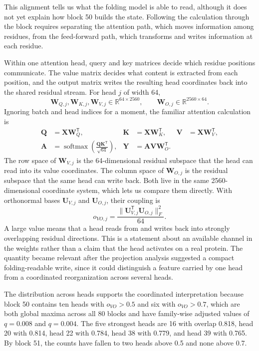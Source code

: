 \documentclass[11pt]{article}
\newcommand{\R}{\mathbb{R}}
\newcommand{\mat}[1]{\mathbf{#1}}
\begin{document}
This alignment tells us what the folding model is able to read, although it does not yet explain how block 50 builds the state. Following the calculation through the block requires separating the attention path, which moves information among residues, from the feed-forward path, which transforms and writes information at each residue.

Within one attention head, query and key matrices decide which residue positions communicate. The value matrix decides what content is extracted from each position, and the output matrix writes the resulting head coordinates back into the shared residual stream. For head $j$ of width 64,
\[
\mat{W}_{Q,j},\mat{W}_{K,j},\mat{W}_{V,j}\in\R^{64\times2560},
\qquad
\mat{W}_{O,j}\in\R^{2560\times64}.
\]
Ignoring batch and head indices for a moment, the familiar attention calculation is
\begin{align}
\mat{Q}&=\mat{X}\mat{W}_{Q}^{\mathsf T},
&\mat{K}&=\mat{X}\mat{W}_{K}^{\mathsf T},
&\mat{V}&=\mat{X}\mat{W}_{V}^{\mathsf T},\\
\mat{A}&=\operatorname{softmax}\!\left(\frac{\mat{Q}\mat{K}^{\mathsf T}}{\sqrt{64}}\right),
&\mat{Y}&=\mat{A}\mat{V}\mat{W}_{O}^{\mathsf T}.
\end{align}
The row space of $\mat{W}_{V,j}$ is the 64-dimensional residual subspace that the head can read into its value coordinates. The column space of $\mat{W}_{O,j}$ is the residual subspace that the same head can write back. Both live in the same 2560-dimensional coordinate system, which lets us compare them directly. With orthonormal bases $\mat{U}_{V,j}$ and $\mat{U}_{O,j}$, their coupling is
\begin{equation}
o_{VO,j}=\frac{\|\mat{U}_{V,j}^{\mathsf T}\mat{U}_{O,j}\|_F^2}{64}.
\label{eq:vo}
\end{equation}
A large value means that a head reads from and writes back into strongly overlapping residual directions. This is a statement about an available channel in the weights rather than a claim that the head activates on a real protein. The quantity became relevant after the projection analysis suggested a compact folding-readable write, since it could distinguish a feature carried by one head from a coordinated reorganization across several heads.

The distribution across heads supports the coordinated interpretation because block 50 contains ten heads with $o_{VO}>0.5$ and six with $o_{VO}>0.7$, which are both global maxima across all 80 blocks and have family-wise adjusted values of $q=0.008$ and $q=0.004$. The five strongest heads are 16 with overlap 0.818, head 20 with 0.814, head 22 with 0.784, head 38 with 0.779, and head 39 with 0.765. By block 51, the counts have fallen to two heads above 0.5 and none above 0.7.
\end{document}
